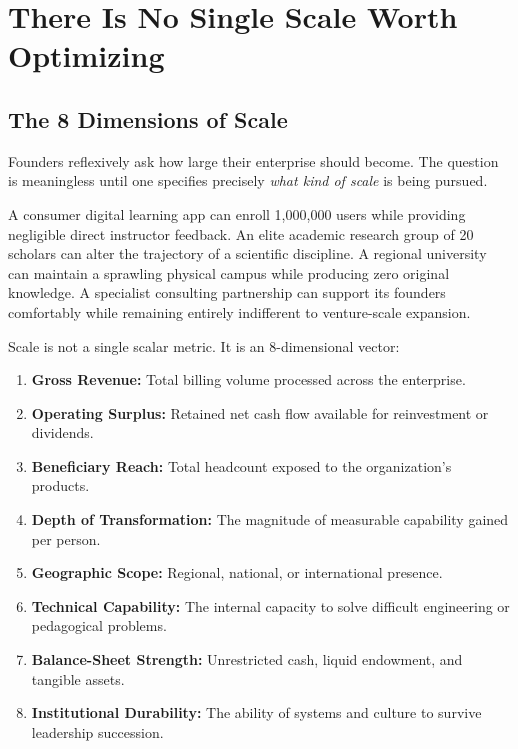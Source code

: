 \section{There Is No Single Scale Worth Optimizing}

\subsection{The 8 Dimensions of Scale}

Founders reflexively ask how large their enterprise should become. The question is meaningless until one specifies precisely \textit{what kind of scale} is being pursued.

A consumer digital learning app can enroll 1,000,000 users while providing negligible direct instructor feedback. An elite academic research group of 20 scholars can alter the trajectory of a scientific discipline. A regional university can maintain a sprawling physical campus while producing zero original knowledge. A specialist consulting partnership can support its founders comfortably while remaining entirely indifferent to venture-scale expansion.

Scale is not a single scalar metric. It is an 8-dimensional vector:

\begin{enumerate}[leftmargin=12pt,itemsep=2pt,topsep=1pt,parsep=0pt]
  \item \textbf{Gross Revenue:} Total billing volume processed across the enterprise.
  \item \textbf{Operating Surplus:} Retained net cash flow available for reinvestment or dividends.
  \item \textbf{Beneficiary Reach:} Total headcount exposed to the organization's products.
  \item \textbf{Depth of Transformation:} The magnitude of measurable capability gained per person.
  \item \textbf{Geographic Scope:} Regional, national, or international presence.
  \item \textbf{Technical Capability:} The internal capacity to solve difficult engineering or pedagogical problems.
  \item \textbf{Balance-Sheet Strength:} Unrestricted cash, liquid endowment, and tangible assets.
  \item \textbf{Institutional Durability:} The ability of systems and culture to survive leadership succession.
\end{enumerate}

